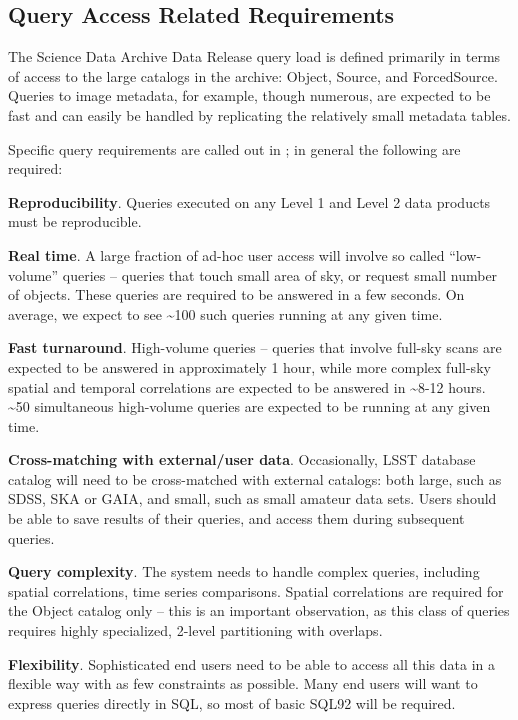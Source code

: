 \documentclass[DM,lsstdraft,toc]{lsstdoc}
\begin{document}
\subsection{Query Access Related Requirements}\label{query-access-related-requirements}

The Science Data Archive Data Release query load is defined primarily in
terms of access to the large catalogs in the archive: Object, Source,
and ForcedSource. Queries to image metadata, for example, though
numerous, are expected to be fast and can easily be handled by
replicating the relatively small metadata tables.

Specific query requirements are called out in ; in general
the following are required:

\textbf{Reproducibility}. Queries executed on any Level 1 and Level 2
data products must be reproducible.

\textbf{Real time}. A large fraction of ad-hoc user access will involve
so called ``low-volume'' queries -- queries that touch small area of
sky, or request small number of objects. These queries are required to
be answered in a few seconds. On average, we expect to see
\textasciitilde{}100 such queries running at any given time.

\textbf{Fast turnaround}. High-volume queries -- queries that involve full-sky
scans are expected to be answered in approximately 1 hour, while more complex
full-sky spatial and temporal correlations are expected to be answered in
\textasciitilde{}8-12 hours. \textasciitilde{}50 simultaneous high-volume
queries are expected to be running at any given time.

\textbf{Cross-matching with external/user data}. Occasionally, LSST
database catalog will need to be cross-matched with external catalogs:
both large, such as SDSS, SKA or GAIA, and small, such as small amateur
data sets. Users should be able to save results of their queries, and
access them during subsequent queries.

\textbf{Query complexity}. The system needs to handle complex queries,
including spatial correlations, time series comparisons. Spatial
correlations are required for the Object catalog only -- this is an
important observation, as this class of queries requires highly
specialized, 2-level partitioning with overlaps.

\textbf{Flexibility}. Sophisticated end users need to be able to access
all this data in a flexible way with as few constraints as possible.
Many end users will want to express queries directly in SQL, so most of
basic SQL92 will be required.
\end{document}
